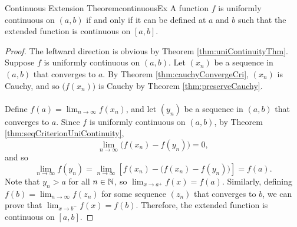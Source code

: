 \documentclass[math]{amznotes}
\theoremstyle{remark}
\begin{document}
\begin{thmbox}{Continuous Extension Theorem}{continuousEx}
    A function $f$ is uniformly continuous on $(a, b)$ if and only if it can be defined at $a$ and $b$ such that the extended function is continuous on $[a, b]$.
    \tcblower
    \begin{proof}
        The leftward direction is obvious by Theorem \ref{thm:uniContinuityThm}. Suppose $f$ is uniformly continuous on $(a, b)$. Let $(x_n)$ be a sequence in $(a, b)$ that converges to $a$. By Theorem \ref{thm:cauchyConvergeCri}, $(x_n)$ is Cauchy, and so $\bigl(f(x_n)\bigr)$ is Cauchy by Theorem \ref{thm:preserveCauchy}. 
        \\\\
        Define $f(a) = \lim_{n \to \infty}f(x_n)$, and let $(y_n)$ be a sequence in $(a, b)$ that converges to $a$. Since $f$ is uniformly continuous on $(a, b)$, by Theorem \ref{thm:seqCriterionUniContinuity}, 
        \begin{equation*}
            \lim_{n \to \infty}\bigl(f(x_n) - f(y_n)\bigr) = 0,
        \end{equation*}
        and so 
        \begin{equation*}
            \lim_{n \to \infty}f(y_n) = \lim_{n \to \infty}\left[f(x_n) - \bigl(f(x_n) - f(y_n)\bigr)\right] = f(a).
        \end{equation*}
        Note that $y_n > a$ for all $n \in \mathbb{N}$, so $\lim_{x \to a^+}f(x) = f(a)$. Similarly, defining $f(b) = \lim_{n \to \infty}f(z_n)$ for some sequence $(z_n)$ that converges to $b$, we can prove that $\lim_{x \to b^-}f(x) = f(b)$. Therefore, the extended function is continuous on $[a, b]$.
    \end{proof}
\end{thmbox}
\end{document}
